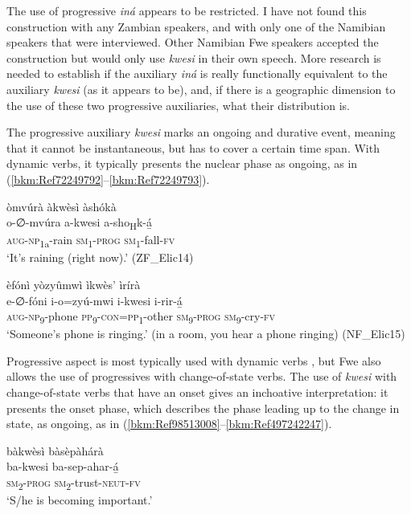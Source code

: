 The use of progressive \textit{iná} appears to be restricted. I have not found this construction with any Zambian speakers, and with only one of the Namibian speakers that were interviewed. Other Namibian Fwe speakers accepted the construction but would only use \textit{kwesi} in their own speech. More research is needed to establish if the auxiliary \textit{iná} is really functionally equivalent to the auxiliary \textit{kwesi} (as it appears to be), and, if there is a geographic dimension to the use of these two progressive auxiliaries, what their distribution is.

The progressive auxiliary \textit{kwesi} marks an ongoing and durative event, meaning that it cannot be instantaneous, but has to cover a certain time span. With dynamic verbs, it typically presents the nuclear phase as ongoing, as in (\ref{bkm:Ref72249792}--\ref{bkm:Ref72249793}).

\ea
\label{bkm:Ref72249792}
òmvúrà àkwèsì àshókà\\
\gll o-∅-mvúra    a-kwesi  a-sho\textsubscript{H}k-á̲\\
\textsc{aug}-\textsc{np}\textsubscript{1a}-rain  \textsc{sm}\textsubscript{1}-\textsc{prog}  \textsc{sm}\textsubscript{1}-fall-\textsc{fv}\\
\glt ‘It’s raining (right now).’ (ZF\_Elic14)
\z

\ea
\label{bkm:Ref72249793}
èfónì yòzyûmwì ìkwès’ ìrírà\\
\gll e-∅-fóni    i-o=zyú-mwi  i-kwesi  i-rir-á̲\\
\textsc{aug}-\textsc{np}\textsubscript{9}-phone  \textsc{pp}\textsubscript{9}-\textsc{con}=\textsc{pp}\textsubscript{1}-other  \textsc{sm}\textsubscript{9}-\textsc{prog}  \textsc{sm}\textsubscript{9}-cry-\textsc{fv}\\
\glt ‘Someone’s phone is ringing.’ (in a room, you hear a phone ringing) (NF\_Elic15)
\z

Progressive aspect is most typically used with dynamic verbs \citep[35]{Comrie1976}, but Fwe also allows the use of progressives with change-of-state verbs. The use of \textit{kwesi} with change-of-state verbs that have an onset gives an inchoative interpretation: it presents the onset phase, which describes the phase leading up to the change in state, as ongoing, as in (\ref{bkm:Ref98513008}--\ref{bkm:Ref497242247}).

\ea
\label{bkm:Ref98513008}
bàkwèsì bàsèpàhárà\\
\gll ba-kwesi  ba-sep-ahar-á̲\\
\textsc{sm}\textsubscript{2}-\textsc{prog}  \textsc{sm}\textsubscript{2}-trust-\textsc{neut}-\textsc{fv}\\
\glt ‘S/he is becoming important.’
\z

